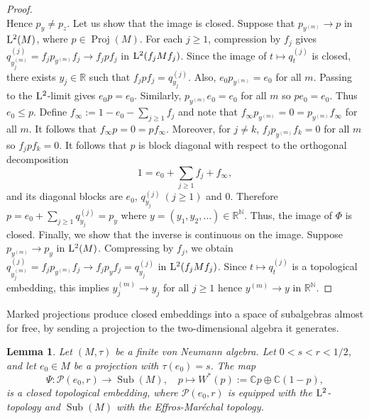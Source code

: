 \documentclass[12pt]{amsart} %
\theoremstyle{plain}
\newtheorem{lemma}[theorem]{Lemma}
\theoremstyle{definition}
\DeclareMathOperator{\Sub}{Sub}
\DeclareMathOperator{\Proj}{Proj}
\begin{document}
\begin{proof}
\[\]
Hence $p_y\neq p_z$.
\medskip
\noindent Let us show that the image is closed. Suppose that $p_{y^{(m)}}\to p$ in ${\rm L}^2(M)$, where \(p\in\Proj(M)\). For each \(j\geq1\), compression by \(f_j\) gives $q_{y^{(m)}_j}^{(j)}=f_jp_{y^{(m)}}f_j\to f_jpf_j$ in ${\rm L}^2(f_jMf_j)$. Since the image of $t\mapsto q_t^{(j)}$ is closed, there exists \(y_j\in\mathbb R\) such that $f_jpf_j=q_{y_j}^{(j)}$. Also, $e_0p_{y^{(m)}}=e_0$ for all $m$. Passing to the \({\rm L}^2\)-limit gives $e_0p=e_0$. Similarly, $p_{y^{(m)}}e_0=e_0$ for all $m$ so $pe_0=e_0$. Thus \(e_0\leq p\). Define $f_\infty:=1-e_0-\sum_{j\geq1}f_j$ and note that $f_\infty p_{y^{(m)}}=0=p_{y^{(m)}}f_\infty$ for all $m$. It follows that $f_\infty p=0=pf_\infty$. Moreover, for \(j\neq k\), $f_jp_{y^{(m)}}f_k=0$ for all $m$ so $f_jpf_k=0$. It follows that \(p\) is block diagonal with respect to the orthogonal decomposition
\[
        1=e_0+\sum_{j\geq1}f_j+f_\infty,
\]
and its diagonal blocks are $e_0$, $q_{y_j}^{(j)}\ (j\geq1)$ and  $0$. Therefore $p=e_0+\sum_{j\geq1}q_{y_j}^{(j)}=p_y$ where $y=(y_1,y_2,\dots)\in\mathbb R^{\mathbb N}$. Thus, the image of \(\Phi\) is closed.
\medskip
\noindent Finally, we show that the inverse is continuous on the image. Suppose $p_{y^{(m)}}\to p_y$ in ${\rm L}^2(M)$. Compressing by \(f_j\), we obtain $q_{y^{(m)}_j}^{(j)}=f_jp_{y^{(m)}}f_j\rightarrow f_jp_yf_j=q_{y_j}^{(j)}$ in ${\rm L}^2(f_jMf_j)$. Since $t\mapsto q_t^{(j)}$ is a topological embedding, this implies $y^{(m)}_j\to y_j$ for all $j\geq1$ hence $y^{(m)}\to y$ in \(\mathbb R^{\mathbb N}\).\end{proof}
Marked projections produce closed embeddings into a space of subalgebras almost for free, by sending a projection to the two-dimensional algebra it generates.
\begin{lemma}
\label{LemMarkedProjectionsToSubalgebras}
Let \((M,\tau)\) be a finite von Neumann algebra. Let \(0<s<r<1/2\), and let
\(e_0\in M\) be a projection with $\tau(e_0)=s$. The map
$$
        \Psi:\mathcal P(e_0,r)\rightarrow \Sub(M),
        \quad
        p\mapsto W^*(p):=\mathbb C p\oplus \mathbb C(1-p),
$$
is a closed topological embedding, where \(\mathcal P(e_0,r)\) is equipped with the
\({\rm L}^2\)-topology and \(\Sub(M)\) with the Effros-Mar\'echal topology.
\end{lemma}
\end{document}

